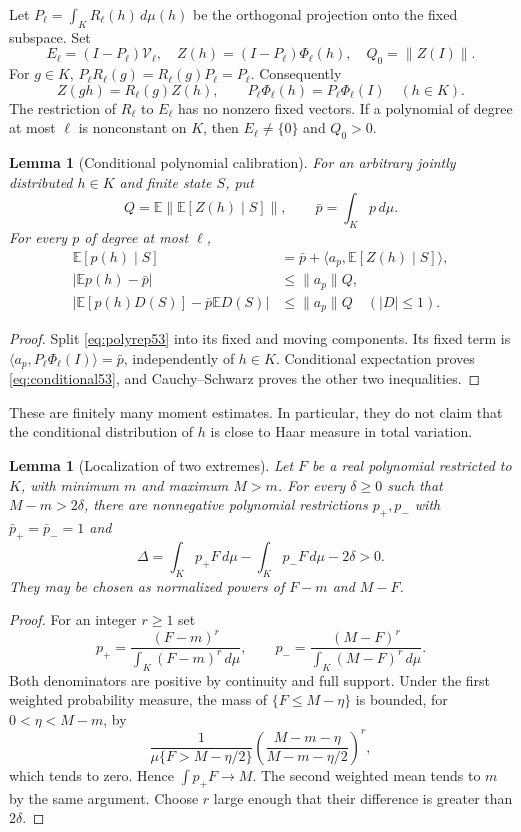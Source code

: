 \documentclass[11pt]{amsart}
\numberwithin{equation}{section}
\newtheorem{lemma}[theorem]{Lemma}
\theoremstyle{definition}
\theoremstyle{remark}
\newcommand{\E}{\mathbb E}
\newcommand{\ip}[2]{\langle #1,#2\rangle}
\newcommand{\norm}[1]{\lVert #1\rVert}
\begin{document}
Let $P_\ell=\int_K R_\ell(h)\,d\mu(h)$ be the orthogonal projection onto the fixed subspace. Set
\begin{equation}\label{eq:feature53}
 E_\ell=(I-P_\ell)\mathcal V_\ell,\quad
 Z(h)=(I-P_\ell)\Phi_\ell(h),\quad Q_0=\norm{Z(I)}.
\end{equation}
For $g\in K$, $P_\ell R_\ell(g)=R_\ell(g)P_\ell=P_\ell$. Consequently
\[
 Z(gh)=R_\ell(g)Z(h),\qquad
 P_\ell\Phi_\ell(h)=P_\ell\Phi_\ell(I)\quad(h\in K).
\]
The restriction of $R_\ell$ to $E_\ell$ has no nonzero fixed vectors. If a polynomial of degree at most $\ell$ is nonconstant on $K$, then $E_\ell\ne\{0\}$ and $Q_0>0$.

\begin{lemma}[Conditional polynomial calibration]\label{lem:polycal53}
For an arbitrary jointly distributed $h\in K$ and finite state $S$, put
\[
 Q=\E\norm{\E[Z(h)\mid S]},\qquad \bar p=\int_Kp\,d\mu.
\]
For every $p$ of degree at most $\ell$,
\begin{align}
 \E[p(h)\mid S]&=\bar p+\ip{a_p}{\E[Z(h)\mid S]},\label{eq:conditional53}\\
 |\E p(h)-\bar p|&\le\norm{a_p}Q,\label{eq:unconditional53}\\
 |\E[p(h)D(S)]-\bar p\E D(S)|&\le\norm{a_p}Q\quad (|D|\le1).\label{eq:decoder53}
\end{align}
\end{lemma}
\begin{proof}
Split \eqref{eq:polyrep53} into its fixed and moving components. Its fixed term is $\ip{a_p}{P_\ell\Phi_\ell(I)}=\bar p$, independently of $h\in K$. Conditional expectation proves \eqref{eq:conditional53}, and Cauchy--Schwarz proves the other two inequalities.
\end{proof}
These are finitely many moment estimates. In particular, they do not claim that the conditional distribution of $h$ is close to Haar measure in total variation.

\begin{lemma}[Localization of two extremes]\label{lem:localize53}
Let $F$ be a real polynomial restricted to $K$, with minimum $m$ and maximum $M>m$. For every $\delta\ge0$ such that $M-m>2\delta$, there are nonnegative polynomial restrictions $p_+,p_-$ with $\bar p_+=\bar p_-=1$ and
\begin{equation}\label{eq:Delta53}
 \Delta=\int_Kp_+F\,d\mu-\int_Kp_-F\,d\mu-2\delta>0.
\end{equation}
They may be chosen as normalized powers of $F-m$ and $M-F$.
\end{lemma}
\begin{proof}
For an integer $r\ge1$ set
\[
 p_+=\frac{(F-m)^r}{\int_K(F-m)^r\,d\mu},\qquad
 p_-=\frac{(M-F)^r}{\int_K(M-F)^r\,d\mu}.
\]
Both denominators are positive by continuity and full support. Under the first weighted probability measure, the mass of $\{F\le M-\eta\}$ is bounded, for $0<\eta<M-m$, by
\[
 \frac1{\mu\{F>M-\eta/2\}}
 \left(\frac{M-m-\eta}{M-m-\eta/2}\right)^r,
\]
which tends to zero. Hence $\int p_+F\to M$. The second weighted mean tends to $m$ by the same argument. Choose $r$ large enough that their difference is greater than $2\delta$.
\end{proof}
\end{document}
